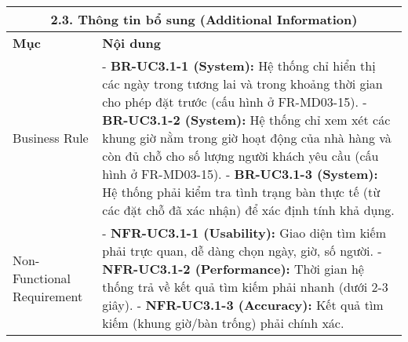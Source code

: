 \begin{longtable}{|m{4cm}|p{11cm}|}
\hline
\multicolumn{2}{|c|}{\textbf{2.3. Thông tin bổ sung (Additional Information)}} \\
\hline
\textbf{Mục} & \textbf{Nội dung} \\
\hline
Business Rule & - \textbf{BR-UC3.1-1 (System):} Hệ thống chỉ hiển thị các ngày trong tương lai và trong khoảng thời gian cho phép đặt trước (cấu hình ở FR-MD03-15). \newline - \textbf{BR-UC3.1-2 (System):} Hệ thống chỉ xem xét các khung giờ nằm trong giờ hoạt động của nhà hàng và còn đủ chỗ cho số lượng người khách yêu cầu (cấu hình ở FR-MD03-15). \newline - \textbf{BR-UC3.1-3 (System):} Hệ thống phải kiểm tra tình trạng bàn thực tế (từ các đặt chỗ đã xác nhận) để xác định tính khả dụng. \\
\hline
Non-Functional Requirement & - \textbf{NFR-UC3.1-1 (Usability):} Giao diện tìm kiếm phải trực quan, dễ dàng chọn ngày, giờ, số người. \newline - \textbf{NFR-UC3.1-2 (Performance):} Thời gian hệ thống trả về kết quả tìm kiếm phải nhanh (dưới 2-3 giây). \newline - \textbf{NFR-UC3.1-3 (Accuracy):} Kết quả tìm kiếm (khung giờ/bàn trống) phải chính xác. \\
\hline
\end{longtable}

